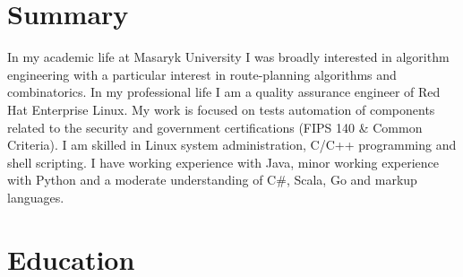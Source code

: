 \documentclass[11pt,a4paper]{moderncv}
\title{}
\begin{document}
\maketitle

\medskip

\vspace{-2ex}
\section{Summary}

In my academic life at Masaryk University I was broadly interested in algorithm
engineering with a particular interest in route-planning algorithms and 
combinatorics. In my professional life I am a quality assurance engineer of 
Red Hat Enterprise Linux. My work is focused on tests automation of components 
related to the security and government certifications (FIPS 140 \& Common 
Criteria). I am skilled in Linux system administration, C/C++ programming and 
shell scripting. I have working experience with Java, minor working experience
with Python and a moderate understanding of C\#, Scala, Go and markup languages.

\section{Education}




\end{document}

